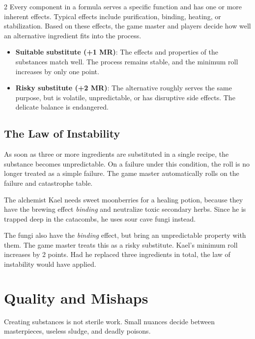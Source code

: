 \begin{multicols}{2}
Every component in a formula serves a specific function and has one or more inherent effects. Typical effects include purification, binding, heating, or stabilization. Based on these effects, the game master and players decide how well an alternative ingredient fits into the process.

\begin{itemize}
    \item \textbf{Suitable substitute (+1 MR)}: The effects and properties of the substances match well. The process remains stable, and the minimum roll increases by only one point.
    \item \textbf{Risky substitute (+2 MR)}: The alternative roughly serves the same purpose, but is volatile, unpredictable, or has disruptive side effects. The delicate balance is endangered.
\end{itemize}

\subsection{The Law of Instability}

As soon as three or more ingredients are substituted in a single recipe, the substance becomes unpredictable. On a failure under this condition, the roll is no longer treated as a simple failure. The game master automatically rolls on the failure and catastrophe table.

\begin{pexample}[Example]
The alchemist Kael needs sweet moonberries for a healing potion, because they have the brewing effect \textit{binding} and neutralize toxic secondary herbs. Since he is trapped deep in the catacombs, he uses sour cave fungi instead.

The fungi also have the \textit{binding} effect, but bring an unpredictable property with them. The game master treats this as a risky substitute. Kael's minimum roll increases by 2 points. Had he replaced three ingredients in total, the law of instability would have applied.
\end{pexample}

\section{Quality and Mishaps}

Creating substances is not sterile work. Small nuances decide between masterpieces, useless sludge, and deadly poisons.


\end{multicols}
